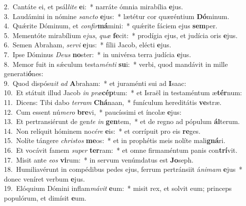 {2.~}Cantáte ei, et psál\textit{li}\textit{te} \textbf{e}i:~* narráte ómnia mirabília \textbf{e}jus.\\
{3.~}Laudámini in nómine \textit{san}\textit{cto} \textbf{e}jus:~* lætétur cor quæréntium \textbf{Dó}minum.\\
{4.~}Quǽrite Dóminum, et \textit{con}\textit{fir}\textbf{má}mini:~* quǽrite fáciem ejus \textbf{sem}per.\\
{5.~}Mementóte mirabílium e\textit{jus}, \textit{quæ} \textbf{fe}cit:~* prodígia ejus, et judícia oris \textbf{e}jus.\\
{6.~}Semen Abraham, \textit{ser}\textit{vi} \textbf{e}jus:~* fílii Jacob, elécti \textbf{e}jus.\\
{7.~}Ipse Dóminus \textit{De}\textit{us} \textbf{no}ster:~* in univérsa terra judícia \textbf{e}jus.\\
{8.~}Memor fuit in sǽculum testa\textit{mén}\textit{ti} \textbf{su}i:~* verbi, quod mandávit in mille generati\textbf{ó}nes:\\
{9.~}Quod dispósu\textit{it} \textit{ad} \textbf{A}braham:~* et juraménti sui ad \textbf{I}saac:\\
{10.~}Et státuit illud Jacob \textit{in} \textit{præ}\textbf{cép}tum:~* et Israël in testaméntum æ\textbf{tér}num:\\
{11.~}Dicens: Tibi dabo \textit{ter}\textit{ram} \textbf{Chá}naan,~* funículum hereditátis \textbf{ve}stræ.\\
{12.~}Cum essent nú\textit{me}\textit{ro} \textbf{bre}vi,~* paucíssimi et íncolæ \textbf{e}jus:\\
{13.~}Et pertransiérunt de gen\textit{te} \textit{in} \textbf{gen}tem,~* et de regno ad pópulum \textbf{ál}terum.\\
{14.~}Non relíquit hóminem no\textit{cé}\textit{re} \textbf{e}is:~* et corrípuit pro eis \textbf{re}ges.\\
{15.~}Nolíte tángere \textit{chri}\textit{stos} \textbf{me}os:~* et in prophétis meis nolíte mali\textbf{gná}ri.\\
{16.~}Et vocávit famem \textit{su}\textit{per} \textbf{ter}ram:~* et omne firmaméntum panis con\textbf{trí}vit.\\
{17.~}Misit ante \textit{e}\textit{os} \textbf{vi}rum:~* in servum venúmdatus est \textbf{Jo}seph.\\
{18.~}Humiliavérunt in compédibus pedes ejus, ferrum pertránsiit á\textit{ni}\textit{mam} \textbf{e}jus~* donec veníret verbum \textbf{e}jus.\\
{19.~}Elóquium Dómini inflam\textit{má}\textit{vit} \textbf{e}um:~* misit rex, et solvit eum; princeps populórum, et dimísit \textbf{e}um.\\
